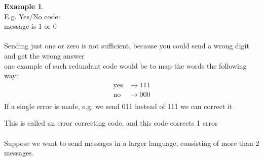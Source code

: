 \documentclass[]{article}
\theoremstyle{definition}
\newtheorem*{exmp}{Example}
\theoremstyle{remark}
\numberwithin{equation}{section}
\begin{document}
	\begin{exmp}\hfill\\
	E.g. Yes/No code:\\
	message is 1 or 0\\
	\\
	Sending just one or zero is not sufficient, because you could send a wrong digit and get the wrong answer\\

	one example of such redundant code would be to map the words the following way: \\	
		\begin{align*}
			\text{yes} &\rightarrow 111\\
			\text{no} &\rightarrow 000\\
		\end{align*}
	If a single error is made, e.g. we send 011 instead of 111 we can correct it
	\end{exmp}
	This is called an error correcting code, and this code corrects 1 error\\
	\\
	Suppose we want to send messages in a larger language, consisting of more than 2 messages.\\
\end{document}
